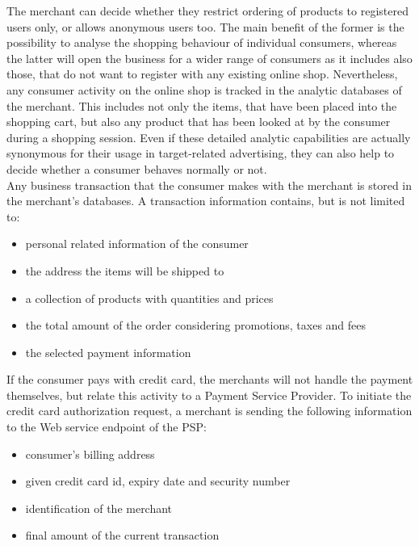 The merchant can decide whether they restrict ordering of products to registered users only, or allows anonymous users too. The main benefit of the former is the possibility to analyse the shopping behaviour of individual consumers, whereas the latter will open the business for a wider range of consumers as it includes also those, that do not want to register with any existing online shop. Nevertheless, any consumer activity on the online shop is tracked in the analytic databases of the merchant. This includes not only the items, that have been placed into the shopping cart, but also any product that has been looked at by the consumer during a shopping session. Even if these detailed analytic capabilities are actually synonymous for their usage in target-related advertising, they can also help to decide whether a consumer behaves normally or not. \\

Any business transaction that the consumer makes with the merchant is stored in the merchant's databases. A transaction information contains, but is not limited to:\@

\begin{itemize}
		\item personal related information of the consumer
		\item the address the items will be shipped to
		\item a collection of products with quantities and prices
		\item the total amount of the order considering promotions, taxes and fees
		\item the selected payment information
\end{itemize}

If the consumer pays with credit card, the merchants will not handle the payment themselves, but relate this activity to a Payment Service Provider. To initiate the credit card authorization request, a merchant is sending the following information to the Web service endpoint of the \gls{PSP}: \@

\begin{itemize}
    \item consumer's billing address
    \item given credit card id, expiry date and security number
    \item identification of the merchant
    \item final amount of the current transaction
\end{itemize}

